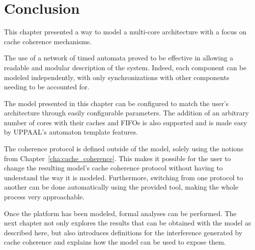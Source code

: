 \section{Conclusion}
This chapter presented a way to model a multi-core architecture with a focus on
cache coherence mechanisms.

The use of a network of timed automata proved to be effective in allowing a
readable and modular description of the system. Indeed, each component can be
modeled independently, with only synchronizations with other components needing
to be accounted for.

The model presented in this chapter can be configured to match the user's
architecture through easily configurable parameters. The addition of an
arbitrary number of cores with their caches and FIFOs is also supported and is
made easy by UPPAAL's automaton template features.

The coherence protocol is defined outside of the model, solely using the
notions from Chapter~\ref{cha:cache_coherence}. This makes it possible for the
user to change the resulting model's cache coherence protocol without having to
understand the way it is modeled. Furthermore, switching from
one protocol to another can be done automatically using the provided tool,
making the whole process very approachable.

Once the platform has been modeled, formal analyses can be performed. The next
chapter not only explores the results that can be obtained with the model as
described here, but also introduces definitions for the interference generated
by cache coherence and explains how the model can be used to expose them.
